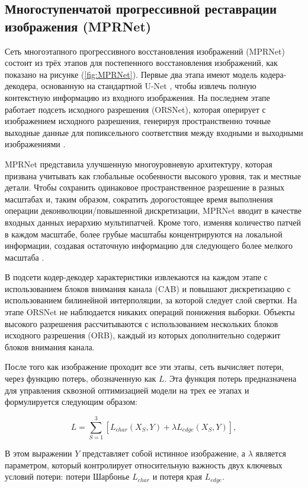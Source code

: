 \subsection{Многоступенчатой прогрессивной реставрации изображения (MPRNet)}

Сеть многоэтапного прогрессивного восстановления изображений (MPRNet) состоит из трёх этапов для постепенного восстановления изображений, как показано на рисунке (\ref{fig:MPRNet}). Первые два этапа имеют модель кодера-декодера, основанную на стандартной U-Net \cite{unet2015}, чтобы извлечь полную контекстную информацию из входного изображения. На последнем этапе работает подсеть исходного разрешения (ORSNet), которая оперирует с изображением исходного разрешения, генерируя пространственно точные выходные данные для попиксельного соответствия между входными и выходными изображениями \cite{zamir2021multi}.

MPRNet представила улучшенную многоуровневую архитектуру, которая призвана учитывать как глобальные особенности высокого уровня, так и местные детали. Чтобы сохранить одинаковое пространственное разрешение в разных масштабах и, таким образом, сократить дорогостоящее время выполнения операции деконволюции/повышенной дискретизации, MPRNet вводит в качестве входных данных иерархию мультипатчей. Кроме того, изменяя количество патчей в каждом масштабе, более грубые масштабы концентрируются на локальной информации, создавая остаточную информацию для следующего более мелкого масштаба \cite{rajaei2023analysis}.

В подсети кодер-декодер характеристики извлекаются на каждом этапе с использованием блоков внимания канала (CAB) и повышают дискретизацию с использованием билинейной интерполяции, за которой следует слой свертки. На этапе ORSNet не наблюдается никаких операций понижения выборки. Объекты высокого разрешения рассчитываются с использованием нескольких блоков исходного разрешения (ORB), каждый из которых дополнительно содержит блоков внимания канала.

После того как изображение проходит все эти этапы, сеть вычисляет потери, через функцию потерь, обозначенную как \(L\). Эта функция потерь предназначена для управления сквозной оптимизацией модели на трех ее этапах и формулируется следующим образом:

\begin{equation}
	L = \sum_{S=1}^{3} [L_{char}(X_S, Y) + \lambda L_{edge}(X_S, Y)],
\end{equation}

В этом выражении \( Y \) представляет собой истинное изображение, а \( \lambda \) является параметром, который контролирует относительную важность двух ключевых условий потери: потери Шарбонье \( L_{char} \) и потеря края \( L_{edge} \).

